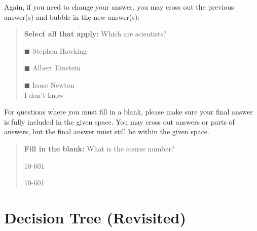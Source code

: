 \documentclass[11pt,addpoints,answers]{exam}
\numberwithin{equation}{section} %
\numberwithin{figure}{section} %
\numberwithin{table}{section} %
\begin{document}
Again, if you need to change your answer, you may cross out the previous answer(s) and bubble in the new answer(s):

\begin{quote}
\textbf{Select all that apply:} Which are scientists?
    \begin{list}{}
    \item $\blacksquare$ Stephen Hawking 
    \item $\blacksquare$ Albert Einstein
    \item $\blacksquare$ Isaac Newton\\
    \xcancel{$\blacksquare$} I don't know
\end{list}
\end{quote}

For questions where you must fill in a blank, please make sure your final answer is fully included in the given space. You may cross out answers or parts of answers, but the final answer must still be within the given space.

\begin{quote}
\textbf{Fill in the blank:} What is the course number?

\begin{tcolorbox}[fit,height=1cm, width=4cm, blank, borderline={1pt}{-2pt},nobeforeafter]
    \begin{center}\huge10-601\end{center}
    \end{tcolorbox}\hspace{2cm}
    \begin{tcolorbox}[fit,height=1cm, width=4cm, blank, borderline={1pt}{-2pt},nobeforeafter]
    \begin{center}\huge10-601\end{center}
    \end{tcolorbox}
\end{quote}

\clearpage


\section{Decision Tree (Revisited)}
\end{document}
